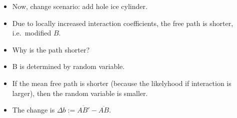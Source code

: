 
\begin{itemize}
\tightlist
\item
  Now, change scenario: add hole ice cylinder.
\item
  Due to locally increased interaction coefficients, the free path is
  shorter, i.e.~modified \(B\).
\item
  Why is the path shorter?
\item
  B is determined by random variable.
\item
  If the mean free path is shorter (because the likelyhood if
  interaction is larger), then the random variable is smaller.
\item
  The change is \(\Delta b:= \overline{AB'} - \overline{AB}\).
\end{itemize}
